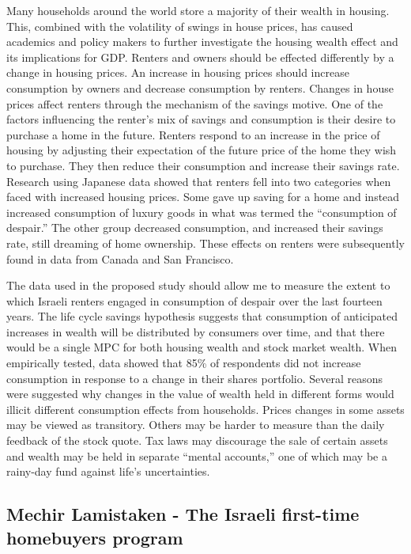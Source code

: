 \documentclass[12pt,a4paper,]{article}
\begin{document}
Many households around the world store a majority of their wealth in
housing. This, combined with the volatility of swings in house prices,
has caused academics and policy makers to further investigate the
housing wealth effect and its implications for GDP.\autocite{Gan2010}
Renters and owners should be effected differently by a change in housing
prices. An increase in housing prices should increase consumption by
owners and decrease consumption by renters. Changes in house prices
affect renters through the mechanism of the savings motive. One of the
factors influencing the renter's mix of savings and consumption is their
desire to purchase a home in the future. Renters respond to an increase
in the price of housing by adjusting their expectation of the future
price of the home they wish to purchase. They then reduce their
consumption and increase their savings rate. Research using Japanese
data showed that renters fell into two categories when faced with
increased housing prices. Some gave up saving for a home and instead
increased consumption of luxury goods in what was termed the
``consumption of despair.'' The other group decreased consumption, and
increased their savings rate, still dreaming of home ownership. These
effects on renters were subsequently found in data from Canada and San
Francisco.\autocite{Sheiner_1995}

The data used in the proposed study should allow me to measure the
extent to which Israeli renters engaged in consumption of despair over
the last fourteen years. The life cycle savings hypothesis suggests that
consumption of anticipated increases in wealth will be distributed by
consumers over time, and that there would be a single MPC for both
housing wealth and stock market wealth. When empirically tested, data
showed that 85\% of respondents did not increase consumption in response
to a change in their shares portfolio. Several reasons were suggested
why changes in the value of wealth held in different forms would illicit
different consumption effects from households. Prices changes in some
assets may be viewed as transitory. Others may be harder to measure than
the daily feedback of the stock quote. Tax laws may discourage the sale
of certain assets and wealth may be held in separate ``mental
accounts,'' one of which may be a rainy-day fund against life's
uncertainties.

\subsection{Mechir Lamistaken - The Israeli first-time homebuyers
program}\label{mechir-lamistaken---the-israeli-first-time-homebuyers-program}
\end{document}
